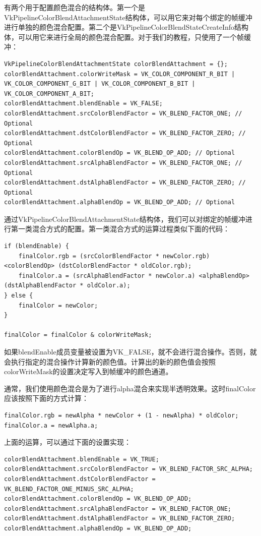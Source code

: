 \documentclass{ctexart}
\begin{document}
有两个用于配置颜色混合的结构体。第一个是VkPipelineColorBlendAttachmentState结构体，可以用它来对每个绑定的帧缓冲进行单独的颜色混合配置。第二个是VkPipelineColorBlendStateCreateInfo结构体，可以用它来进行全局的颜色混合配置。对于我们的教程，只使用了一个帧缓冲：

\begin{lstlisting}[language={[ANSI]C}]
VkPipelineColorBlendAttachmentState colorBlendAttachment = {};
colorBlendAttachment.colorWriteMask = VK_COLOR_COMPONENT_R_BIT | VK_COLOR_COMPONENT_G_BIT | VK_COLOR_COMPONENT_B_BIT | VK_COLOR_COMPONENT_A_BIT;
colorBlendAttachment.blendEnable = VK_FALSE;
colorBlendAttachment.srcColorBlendFactor = VK_BLEND_FACTOR_ONE; // Optional
colorBlendAttachment.dstColorBlendFactor = VK_BLEND_FACTOR_ZERO; // Optional
colorBlendAttachment.colorBlendOp = VK_BLEND_OP_ADD; // Optional
colorBlendAttachment.srcAlphaBlendFactor = VK_BLEND_FACTOR_ONE; // Optional
colorBlendAttachment.dstAlphaBlendFactor = VK_BLEND_FACTOR_ZERO; // Optional
colorBlendAttachment.alphaBlendOp = VK_BLEND_OP_ADD; // Optional
\end{lstlisting}

通过VkPipelineColorBlendAttachmentState结构体，我们可以对绑定的帧缓冲进行第一类混合方式的配置。第一类混合方式的运算过程类似下面的代码：

\begin{lstlisting}[language={[ANSI]C}]
if (blendEnable) {
	finalColor.rgb = (srcColorBlendFactor * newColor.rgb) <colorBlendOp> (dstColorBlendFactor * oldColor.rgb);
	finalColor.a = (srcAlphaBlendFactor * newColor.a) <alphaBlendOp> (dstAlphaBlendFactor * oldColor.a);
} else {
	finalColor = newColor;
}

finalColor = finalColor & colorWriteMask;
\end{lstlisting}

如果blendEnable成员变量被设置为VK\_FALSE，就不会进行混合操作。否则，就会执行指定的混合操作计算新的颜色值。计算出的新的颜色值会按照colorWriteMask的设置决定写入到帧缓冲的颜色通道。

通常，我们使用颜色混合是为了进行alpha混合来实现半透明效果。这时finalColor应该按照下面的方式计算：

\begin{lstlisting}[language={[ANSI]C}]
finalColor.rgb = newAlpha * newColor + (1 - newAlpha) * oldColor;
finalColor.a = newAlpha.a;
\end{lstlisting}

上面的运算，可以通过下面的设置实现：

\begin{lstlisting}[language={[ANSI]C}]
colorBlendAttachment.blendEnable = VK_TRUE;
colorBlendAttachment.srcColorBlendFactor = VK_BLEND_FACTOR_SRC_ALPHA;
colorBlendAttachment.dstColorBlendFactor = VK_BLEND_FACTOR_ONE_MINUS_SRC_ALPHA;
colorBlendAttachment.colorBlendOp = VK_BLEND_OP_ADD;
colorBlendAttachment.srcAlphaBlendFactor = VK_BLEND_FACTOR_ONE;
colorBlendAttachment.dstAlphaBlendFactor = VK_BLEND_FACTOR_ZERO;
colorBlendAttachment.alphaBlendOp = VK_BLEND_OP_ADD;
\end{lstlisting}
\end{document}
